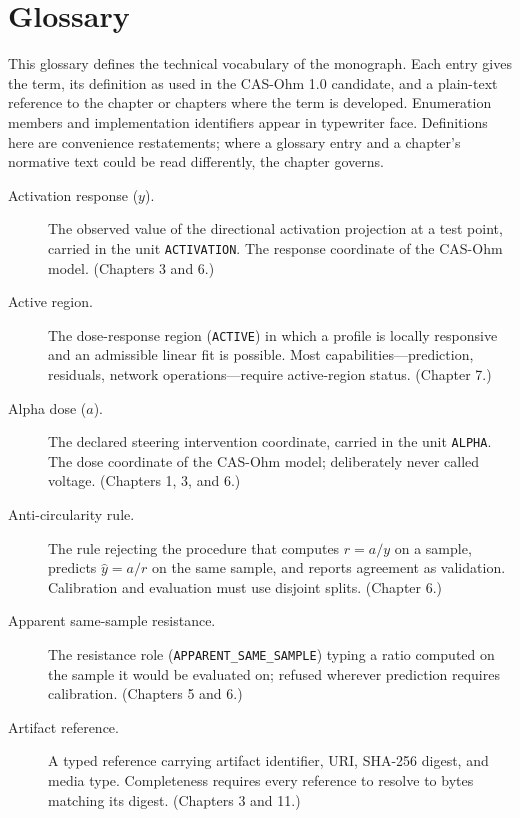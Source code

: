 \chapter{Glossary}\label{gloss:chapter}

This glossary defines the technical vocabulary of the monograph. Each entry gives the term, its definition as used in the CAS-Ohm 1.0 candidate, and a plain-text reference to the chapter or chapters where the term is developed. Enumeration members and implementation identifiers appear in typewriter face. Definitions here are convenience restatements; where a glossary entry and a chapter's normative text could be read differently, the chapter governs.

\begin{description}

\item[Activation response ($y$).] The observed value of the directional activation projection at a test point, carried in the unit \texttt{ACTIVATION}. The response coordinate of the CAS-Ohm model. (Chapters 3 and 6.)

\item[Active region.] The dose-response region (\texttt{ACTIVE}) in which a profile is locally responsive and an admissible linear fit is possible. Most capabilities---prediction, residuals, network operations---require active-region status. (Chapter 7.)

\item[Alpha dose ($a$).] The declared steering intervention coordinate, carried in the unit \texttt{ALPHA}. The dose coordinate of the CAS-Ohm model; deliberately never called voltage. (Chapters 1, 3, and 6.)

\item[Anti-circularity rule.] The rule rejecting the procedure that computes $r = a/y$ on a sample, predicts $\hat y = a/r$ on the same sample, and reports agreement as validation. Calibration and evaluation must use disjoint splits. (Chapter 6.)

\item[Apparent same-sample resistance.] The resistance role (\texttt{APPARENT\_SAME\_SAMPLE}) typing a ratio computed on the sample it would be evaluated on; refused wherever prediction requires calibration. (Chapters 5 and 6.)

\item[Artifact reference.] A typed reference carrying artifact identifier, URI, SHA-256 digest, and media type. Completeness requires every reference to resolve to bytes matching its digest. (Chapters 3 and 11.)


\end{description}
